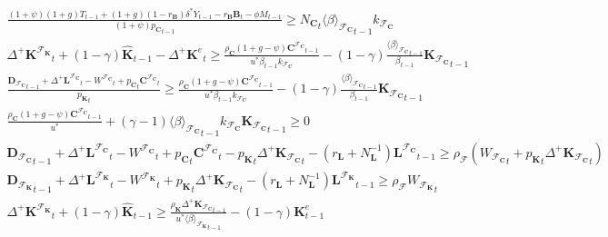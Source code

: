 \documentclass[a4paper, headings=standardclasses]{scrartcl}
\numberwithin{equation}{subsection}
\begin{document}
{\begin{gather}
		\frac{(1+\psi)(1+g){T}_{t-1} + (1+g)(1-r_\mathbf{B})\delta^* Y_{t-1} - r_\mathbf{B} \mathbf{B}_t - \phi M_{t-1}}{(1+\psi) {p_\mathbf{C}}_{t-1}} \ge {N_\mathbf{C}}_t {\langle \beta \rangle_{\mathcal{F}_\mathbf{C}}}_{t-1} k_{\mathcal{F}_\mathbf{C}} \\
		{\Delta^+\mathbf{K}^{\mathcal{F}_\mathbf{K}}}_t + (1-\gamma)\hat{\mathbf{K}}_{t-1} - {\Delta^+\mathbf{K}^e}_t \ge \frac{\rho_\mathbf{C} (1 + g - \psi) {\mathbf{C}^{\mathcal{F}_\mathbf{C}}}_{t-1}}{u^* \beta_{t-1} k_{\mathcal{F}_\mathbf{C}}} - (1 - \gamma) \frac{{\langle\beta\rangle_{\mathcal{F}_\mathbf{C}}}_{t-1}}{\beta_{t-1}} {\mathbf{K}_{\mathcal{F}_\mathbf{C}}}_{t-1} \\
		\frac{{\mathbf{D}_{\mathcal{F}_\mathbf{C}}}_{t-1} + {\Delta^+{\mathbf{L}^{\mathcal{F}_\mathbf{C}}}}_t - {W^{\mathcal{F}_\mathbf{C}}}_t + {p_{\mathbf{C}}}_t {\mathbf{C}^{\mathcal{F}_\mathbf{C}}}_t}{{p_\mathbf{K}}_t} \ge \frac{\rho_\mathbf{C} (1 + g - \psi) {\mathbf{C}^{\mathcal{F}_\mathbf{C}}}_{t-1}}{u^* \beta_{t-1} k_{\mathcal{F}_\mathbf{C}}} - (1 - \gamma) \frac{{\langle\beta\rangle_{\mathcal{F}_\mathbf{C}}}_{t-1}}{\beta_{t-1}} {\mathbf{K}_{\mathcal{F}_\mathbf{C}}}_{t-1} \\
		\frac{\rho_\mathbf{C} (1 + g - \psi) {\mathbf{C}^{\mathcal{F}_\mathbf{C}}}_{t-1}}{u^*} + (\gamma - 1) {\langle\beta\rangle_{\mathcal{F}_\mathbf{C}}}_{t-1} k_{\mathcal{F}_\mathbf{C}} {\mathbf{K}_{\mathcal{F}_\mathbf{C}}}_{t-1} \ge 0\\
		{\mathbf{D}_{\mathcal{F}_\mathbf{C}}}_{t-1} + {\Delta^+{\mathbf{L}^{\mathcal{F}_\mathbf{C}}}}_t - {W^{\mathcal{F}_\mathbf{C}}}_t + {p_{\mathbf{C}}}_t {\mathbf{C}^{\mathcal{F}_\mathbf{C}}}_t - {p_{\mathbf{K}}}_t {\Delta^+{\mathbf{K}_{\mathcal{F}_\mathbf{C}}}}_t - (r_\mathbf{L} + N_\mathbf{L}^{-1}) {\mathbf{L}^{\mathcal{F}_\mathbf{C}}}_{t-1} \ge \rho_\mathcal{F}({W_{\mathcal{F}_\mathbf{C}}}_t + {p_{\mathbf{K}}}_t {\Delta^+{\mathbf{K}_{\mathcal{F}_\mathbf{C}}}}_t ) \\
		{\mathbf{D}_{\mathcal{F}_\mathbf{K}}}_{t-1} + {\Delta^+{\mathbf{L}^{\mathcal{F}_\mathbf{K}}}}_t - {W^{\mathcal{F}_\mathbf{K}}}_t +  {p_{\mathbf{K}}}_t {\Delta^+{\mathbf{K}_{\mathcal{F}_\mathbf{C}}}}_t - (r_\mathbf{L} + N_\mathbf{L}^{-1}) {\mathbf{L}^{\mathcal{F}_\mathbf{K}}}_{t-1} \ge \rho_\mathcal{F}{W_{\mathcal{F}_\mathbf{K}}}_t \\
		{\Delta^+\mathbf{K}^{\mathcal{F}_\mathbf{K}}}_t + (1-\gamma)\hat{\mathbf{K}}_{t-1} \ge  \frac{\rho_\mathbf{K} {\Delta^+\mathbf{K}_{\mathcal{F}_\mathbf{C}}}_{t-1}}{u^* {\langle \beta \rangle_{\mathcal{F}_\mathbf{K}}}_{t-1}} - (1-\gamma) \mathbf{K}^e_{t-1} \\

\end{gather}}
\end{document}
